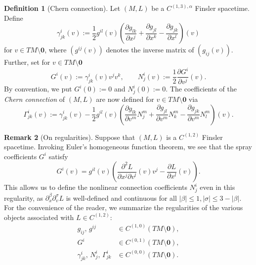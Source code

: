 \documentclass[a4paper,11pt]{article}
\numberwithin{equation}{section}
\theoremstyle{definition}
\newtheorem{Definition}{Definition}[section]
\newtheorem{Remark}[Definition]{Remark}
\theoremstyle{plain}
\begin{document}
\begin{Definition}[Chern connection]
Let $(M,L)$ be a $C^{(1,3),\alpha}$ Finsler spacetime.
Define
\begin{equation}\label{def:FormalChristoffels}
    \gamma^i_{jk}(v):= \frac{1}{2} g^{il}(v) \left( \frac{\partial g_{lk}}{\partial x^j} + \frac{\partial g_{jl}}{\partial x^k} - \frac{\partial g_{jk}}{\partial x^l}\right)(v)
\end{equation}
for $v \in TM \setminus \mathbf{0}$,
where $(g^{ij}(v))$ denotes the inverse matrix of $(g_{ij}(v))$.
Further, set for $v \in TM \setminus \mathbf{0}$
\begin{equation*}
    G^i(v):= \gamma^i_{jk}(v) v^j v^k, \qquad
    N^i_j(v):=\frac{1}{2} \frac{\partial G^i}{\partial v^j}(v).
\end{equation*}
By convention, we put $G^i(0) := 0$ and $N^i_j(0):=0$. 
The coefficients of the \emph{Chern connection} of $(M,L)$ are now defined for $v \in TM \setminus \mathbf{0}$ via
\begin{equation*}
    \Gamma^i_{jk}(v):=\gamma^i_{jk}(v) - \frac{1}{2} g^{il}(v) \left(\frac{\partial g_{lk}}{\partial v^m} N^m_j + \frac{\partial g_{jl}}{\partial v^m} N^m_k - \frac{\partial g_{jk}}{\partial v^m} N^m_l \right)(v).
\end{equation*}
\end{Definition}

\begin{Remark}[On regularities]\label{rm:regular}
Suppose that $(M,L)$ is a $C^{(1,2)}$ Finsler spacetime.
Invoking Euler's homogeneous function theorem, we see that the spray coefficients $G^{i}$ satisfy
\begin{equation}\label{def:SprayCoeffImproved}
    G^i(v)= g^{il}(v) \left( \frac{\partial^2 L}{\partial x^j \partial v^l}(v)v^j- \frac{\partial L}{\partial x^l}(v)\right).
\end{equation}
This allows us to define the nonlinear connection coefficients $N^{i}_j$ even in this regularity, as $\partial_x^{\beta} \partial_v^{\sigma} L$ is well-defined and continuous for all $|\beta| \leq 1, |\sigma| \leq 3-|\beta|$.
For the convenience of the reader, we summarize the regularities of the various objects associated with $L \in C^{(1,2)}$:
\begin{align*}
    g_{ij},\, g^{ij} &\in C^{(1,0)}(TM \setminus \mathbf{0}),\\
    G^{i} &\in C^{(0,1)}(TM \setminus \mathbf{0}),\\
    \gamma^i_{jk},\,N^i_j,\, \Gamma^i_{jk} &\in C^{(0,0)}(TM \setminus \mathbf{0}).
\end{align*}
\end{Remark}
\end{document}
